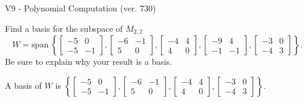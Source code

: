 \begin{exercise}
  \begin{exerciseTitle}V9 - Polynomial Computation (ver. 730)\end{exerciseTitle}
  \begin{exerciseStatement}
    Find a basis for the subspace of \(M_{2,2}\) 
\[W=\mathrm{span}\ \left\{\left[\begin{array}{cc}
-5 & 0 \\
-5 & -1
\end{array}\right] , \left[\begin{array}{cc}
-6 & -1 \\
5 & 0
\end{array}\right] , \left[\begin{array}{cc}
-4 & 4 \\
4 & 0
\end{array}\right] , \left[\begin{array}{cc}
-9 & 4 \\
-1 & -1
\end{array}\right] , \left[\begin{array}{cc}
-3 & 0 \\
-4 & 3
\end{array}\right]\right\}.\]
 Be sure to explain why your result is a basis.


  \end{exerciseStatement}
  \begin{exerciseAnswer}
   A basis of \(W\) is  \(\left\{\left[\begin{array}{cc}
-5 & 0 \\
-5 & -1
\end{array}\right] , \left[\begin{array}{cc}
-6 & -1 \\
5 & 0
\end{array}\right] , \left[\begin{array}{cc}
-4 & 4 \\
4 & 0
\end{array}\right] , \left[\begin{array}{cc}
-3 & 0 \\
-4 & 3
\end{array}\right]\right\}\).
  


  \end{exerciseAnswer}
\end{exercise}